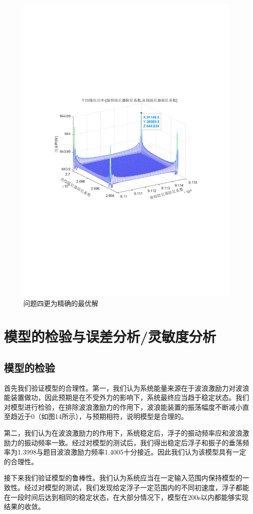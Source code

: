 \documentclass[12pt,utf8]{article}
\begin{document}
\begin{figure}
	\centering
	\includegraphics[width=0.7\linewidth]{figures/更为精确的最优解.pdf}
	\caption{问题四更为精确的最优解}
	\label{fig:}
\end{figure}



\section{模型的检验与误差分析/灵敏度分析}


\subsection{模型的检验}

首先我们验证模型的合理性。第一，我们认为系统能量来源在于波浪激励力对波浪能装置做功，因此预期是在不受外力的影响下，系统最终应当趋于稳定状态。我们对模型进行检验，在排除波浪激励力的作用下，波浪能装置的振荡幅度不断减小直至趋近于0（如图14所示），与预期相符，说明模型是合理的。

第二，我们认为在波浪激励力的作用下，系统稳定后，浮子的振动频率应和波浪激励力的振动频率一致。经过对模型的测试后，我们得出稳定后浮子和振子的垂荡频率为1.3998与题目波浪激励力频率1.4005十分接近。因此我们认为该模型具有一定的合理性。

接下来我们验证模型的鲁棒性。我们认为系统应当在一定输入范围内保持模型的一致性。经过对模型的测试，我们发现给定浮子一定范围内的不同初速度，浮子都能在一段时间后达到相同的稳定状态，在大部分情况下，模型在200s以内都能够实现结果的收敛。
\end{document}
